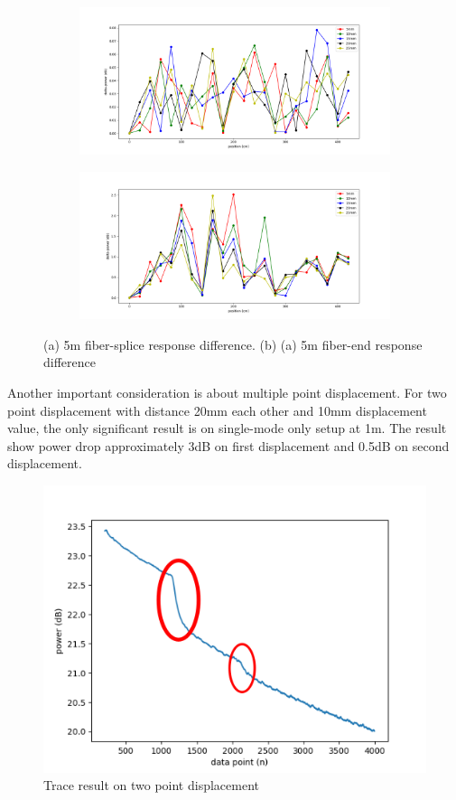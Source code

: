 \documentclass[a4paper,14pt]{article}
\begin{document}
\begin{figure}[h!]
	\centering
	\captionsetup{justification=centering}
	\begin{subfigure}[b]{0.49\textwidth}
		\includegraphics[width=\textwidth]{images/splice1_5}
		\caption{}
	\end{subfigure}
	\begin{subfigure}[b]{0.49\textwidth}
		\includegraphics[width=\textwidth]{images/end_5}
		\caption{}
	\end{subfigure}
	\caption[Setup Diagram]{\small{(a) 5m fiber-splice response difference. (b) (a) 5m fiber-end response difference}}
\end{figure}

Another important consideration is about multiple point displacement.
For two point displacement with distance 20mm each other and 10mm displacement value, the only significant result is on single-mode only setup at 1m.
The result show power drop approximately 3dB on first displacement and 0.5dB on second displacement. 

\begin{figure}[h!]
	\centering
	\captionsetup{justification=centering}
	\includegraphics[width=0.45\linewidth]{images/base_2}
	\caption[Setup Diagram]{\small{Trace result on two point displacement}}
\end{figure}
  
  


\end{document}
